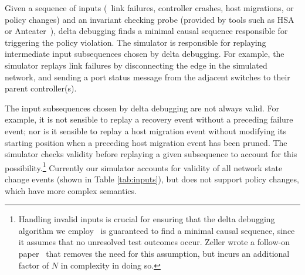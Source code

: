 Given a sequence of inputs (\eg~link failures, controller crashes, host migrations,
or policy changes) and an invariant checking probe (provided by tools
such as HSA~\cite{hsa,hsa_realtime} or Anteater~\cite{anteater,khurshid2012veriflow}),
delta debugging finds a minimal causal sequence responsible for triggering the
policy violation. The
simulator is responsible for replaying intermediate input subsequences
chosen by delta debugging. For example, the simulator replays link failures
by disconnecting the edge in the simulated network, and sending a
port status message from the adjacent switches to their parent controller(s).

The input subsequences chosen by delta debugging are not always valid. For
example, it is not sensible to replay a recovery event without a
preceding failure event; nor is it sensible to replay a host migration
event without modifying its starting position when a preceding host
migration event has been pruned. The simulator checks
validity before replaying a given subsequence to account for this
possibility.\footnote{Handling invalid inputs is crucial for
ensuring that the delta debugging algorithm we employ~\cite{Zeller:1999:YMP:318773.318946}
is guaranteed to find a minimal causal sequence, since it assumes that no unresolved
test outcomes occur. Zeller wrote a follow-on
paper~\cite{Zeller:2002:SIF:506201.506206} that removes the need for this assumption,
but incurs an additional factor of $N$ in complexity in doing so.}
Currently our simulator accounts for validity of all network state change
events (shown in Table \ref{tab:inputs}), but does not support policy changes,
which have more complex semantics.


